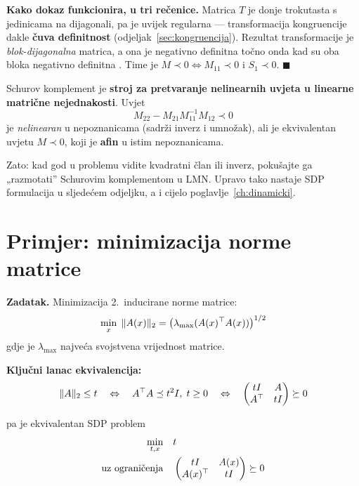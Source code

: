 \textbf{Kako dokaz funkcionira, u tri rečenice.} Matrica $T$ je donje
trokutasta s jedinicama na dijagonali, pa je uvijek regularna --- transformacija
kongruencije dakle \textbf{čuva definitnost} (odjeljak~\ref{sec:kongruencija}).
Rezultat transformacije je \emph{blok-dijagonalna} matrica, a ona je negativno
definitna točno onda kad su oba bloka negativno definitna . Time je
$M \prec 0 \Leftrightarrow M_{11}\prec0$ i $S_1 \prec 0$. $\blacksquare$

\begin{napomena}
Schurov komplement je \textbf{stroj za pretvaranje nelinearnih uvjeta u
linearne matrične nejednakosti}. Uvjet
\[
M_{22} - M_{21}M_{11}^{-1}M_{12} \prec 0
\]
je \emph{nelinearan} u nepoznanicama (sadrži inverz i umnožak), ali je
ekvivalentan uvjetu $M \prec 0$, koji je \textbf{afin} u istim nepoznanicama.

Zato: kad god u problemu vidite kvadratni član ili inverz, pokušajte ga
„razmotati” Schurovim komplementom u LMN. Upravo tako nastaje SDP formulacija
u sljedećem odjeljku, a i cijelo poglavlje~\ref{ch:dinamicki}.
\end{napomena}

\section{Primjer: minimizacija norme matrice}

\textbf{Zadatak.} Minimizacija 2.\ inducirane norme matrice:
\[
\min_x \; \|A(x)\|_2 = \big(\lambda_{\max}(A(x)\T A(x))\big)^{1/2}
\]
gdje je $\lambda_{\max}$ najveća svojstvena vrijednost matrice.

\textbf{Ključni lanac ekvivalencija:}
\begin{equation}
\label{eq:norma-lmi}
\|A\|_2 \le t
\quad\Leftrightarrow\quad
A\T A \preceq t^2I,\; t \ge 0
\quad\Leftrightarrow\quad
\begin{pmatrix} tI & A \\ A\T & tI \end{pmatrix} \succeq 0
\end{equation}

pa je ekvivalentan SDP problem
\[
\begin{aligned}
\min_{t,x} \quad & t \\
\uzogr & \begin{pmatrix} tI & A(x) \\ A(x)\T & tI \end{pmatrix} \succeq 0
\end{aligned}
\]

